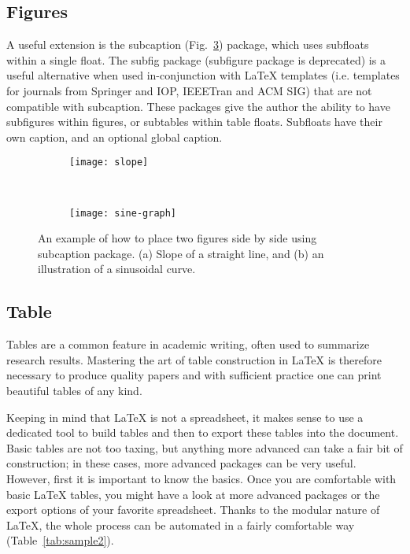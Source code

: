 \documentclass[11pt, a4paper]{article}
\begin{document}
\subsection{Figures}
A useful extension is the subcaption (Fig.~\ref{fig:subfigs cap}) package, which uses subfloats within a single float. The subfig package (subfigure package is deprecated) is a useful alternative when used in-conjunction with LaTeX templates (i.e. templates for journals from Springer and IOP, IEEETran and ACM SIG) that are not compatible with subcaption. These packages give the author the ability to have subfigures within figures, or subtables within table floats. Subfloats have their own caption, and an optional global caption.

\begin{figure}
	\centering
	\begin{subfigure}[b]{0.45\linewidth}
		\centering
		\texttt{[image: slope]}
		\caption{}
		\label{fig:slope}
	\end{subfigure}
	~
	\begin{subfigure}[b]{0.45\linewidth}
		\centering
		\texttt{[image: sine-graph]}
		\caption{}
		\label{fig:sine-graph}
	\end{subfigure}
	\caption{An example of how to place two figures side by side using subcaption package. (a) Slope of a straight line, and (b) an illustration of a sinusoidal curve.}
	\label{fig:subfigs cap}
\end{figure}

\subsection{Table}
Tables are a common feature in academic writing, often used to summarize research results. Mastering the art of table construction in LaTeX is therefore necessary to produce quality papers and with sufficient practice one can print beautiful tables of any kind.

Keeping in mind that LaTeX is not a spreadsheet, it makes sense to use a dedicated tool to build tables and then to export these tables into the document. Basic tables are not too taxing, but anything more advanced can take a fair bit of construction; in these cases, more advanced packages can be very useful. However, first it is important to know the basics. Once you are comfortable with basic LaTeX tables, you might have a look at more advanced packages or the export options of your favorite spreadsheet. Thanks to the modular nature of LaTeX, the whole process can be automated in a fairly comfortable way (Table~\ref{tab:sample2}).
\end{document}

